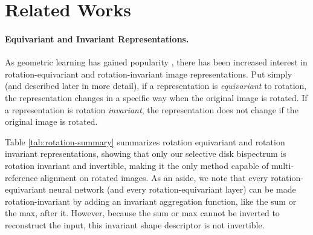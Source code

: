 \section{Related Works}

\paragraph{Equivariant and Invariant Representations.} As geometric learning has gained popularity \cite{bronstein2021geometricdeeplearninggrids}, there has been increased interest in rotation-equivariant and rotation-invariant image representations. Put simply (and described later in more detail), if a representation is \textit{equivariant} to rotation, the representation changes in a specific way when the original image is rotated. If a representation is rotation \textit{invariant}, the representation does not change if the original image is rotated.

Table \ref{tab:rotation-summary} summarizes rotation equivariant and rotation invariant representations, showing that only our selective disk bispectrum is rotation invariant and invertible, making it the only method capable of multi-reference alignment on rotated images. As an aside, we note that every rotation-equivariant neural network (and every rotation-equivariant layer) can be made rotation-invariant by adding an invariant aggregation function, like the sum or the max, after it. However, because the sum or max cannot be inverted to reconstruct the input, this invariant shape descriptor is not invertible.


